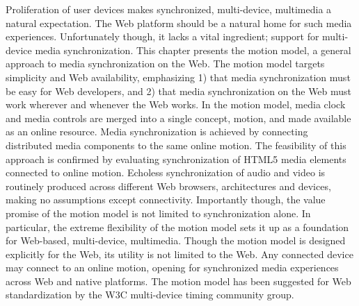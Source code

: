 Proliferation of user devices makes synchronized, multi-device, multimedia
a natural expectation. The Web platform should be a natural home
for such media experiences. Unfortunately though, it lacks a vital ingredient; support for multi-device 
media synchronization. This chapter presents the motion model, a
general approach to media synchronization on the Web. The motion model targets
simplicity and Web availability, emphasizing 1) that media synchronization
must be easy for Web developers, and 2) that media synchronization on the Web
must work wherever and whenever the Web works. In the motion model, media
clock and media controls are merged into a single concept, motion, and made
available as an online resource. Media synchronization is achieved by
connecting distributed media components to the same online motion. The
feasibility of this approach is confirmed by evaluating synchronization of
HTML5 media elements connected to online motion. Echoless synchronization of
audio and video is routinely produced across different Web browsers,
architectures and devices, making no assumptions except connectivity.
Importantly though, the value promise of the motion model is not limited to
synchronization alone. In particular, the extreme flexibility of the motion
model sets it up as a foundation for Web-based, multi-device, multimedia.
Though the motion model is designed explicitly for the Web, its utility is not
limited to the Web. Any connected device may connect to an online motion,
opening for synchronized media experiences across Web and native platforms.
The motion model has been suggested for Web standardization by the W3C multi-device 
timing community group.
